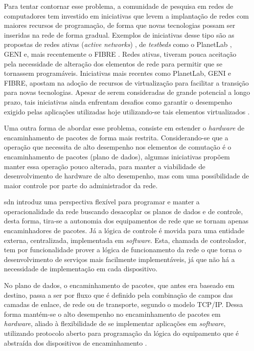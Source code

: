 Para tentar contornar esse problema, a comunidade de pesquisa em redes de computadores tem investido em iniciativas que levem a implantação de redes com maiores recursos de programação, de forma que novas tecnologias possam ser inseridas na rede de forma gradual. Exemplos de iniciativas desse tipo são as propostas de redes ativas (\textit{active networks}) \cite{Tennenhouse:1997}, de \textit{testbeds} como o PlanetLab \cite{Chun:2003}, GENI \cite{Turner:2006} e, mais recentemente o FIBRE \cite{Salmito:2014}. Redes ativas, tiveram pouca aceitação pela necessidade de alteração dos elementos de rede para permitir que se tornassem programáveis. Iniciativas mais recentes como PlanetLab, GENI e FIBRE, apostam na adoção de recursos de virtualização para facilitar a transição para novas tecnologias. Apesar de serem consideradas de grande potencial a longo prazo, tais iniciativas ainda enfrentam desafios como garantir o desempenho exigido pelas aplicações utilizadas hoje utilizando-se tais elementos virtualizados \cite{Guedes:2006}.

Uma outra forma de abordar esse problema, consiste em estender o \textit{hardware} de encaminhamento de pacotes de forma mais restrita. Considerando-se que a operação que necessita de alto desempenho nos elementos de comutação é o encaminhamento de pacotes (plano de dados), algumas iniciativas propõem manter essa operação pouco alterada, para manter a viabilidade de desenvolvimento de hardware de alto desempenho, mas com uma possibilidade de maior controle por parte do administrador da rede. 

\gls{sdn} introduz uma perspectiva flexível para programar e manter a operacionalidade da rede  buscando desacoplar os planos de dados e de controle, desta forma, tira-se a autonomia dos equipamentos de rede que se tornam apenas encaminhadores de pacotes. Já a lógica de controle é movida para uma entidade externa, centralizada, implementada em \textit{software}. Esta, chamada de controlador, tem por funcionalidade prover a lógica de funcionamento da rede o que torna o desenvolvimento de serviços mais facilmente implementáveis, já que não há a necessidade de implementação em cada dispositivo. 

No plano de dados, o encaminhamento de pacotes, que antes era baseado em destino, passa a ser por fluxo que é definido pela combinação de campos das camadas de enlace, de rede ou de transporte, segundo o modelo TCP/IP. Dessa forma mantém-se o alto desempenho no encaminhamento de pacotes em \textit{hardware}, aliado à flexibilidade de se implementar aplicações em \textit{software}, utilizando protocolo aberto para programação da lógica do equipamento que é abstraída dos dispositivos de encaminhamento \cite{Kim:2013, Tootoonchian:2010, Rothenberg:2010}.

